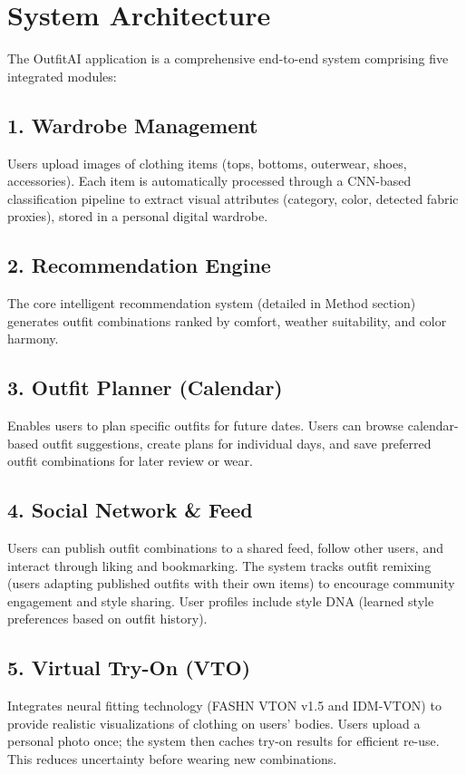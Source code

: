 \documentclass[stu,man]{apa7}
\begin{document}
\section{System Architecture}
The OutfitAI application is a comprehensive end-to-end system comprising five integrated modules:

\subsection{1. Wardrobe Management}
Users upload images of clothing items (tops, bottoms, outerwear, shoes, accessories).
Each item is automatically processed through a CNN-based classification pipeline to extract visual attributes (category, color, detected fabric proxies), stored in a personal digital wardrobe.

\subsection{2. Recommendation Engine}
The core intelligent recommendation system (detailed in Method section) generates outfit combinations ranked by comfort, weather suitability, and color harmony.

\subsection{3. Outfit Planner (Calendar)}
Enables users to plan specific outfits for future dates.
Users can browse calendar-based outfit suggestions, create plans for individual days, and save preferred outfit combinations for later review or wear.

\subsection{4. Social Network \& Feed}
Users can publish outfit combinations to a shared feed, follow other users, and interact through liking and bookmarking.
The system tracks outfit remixing (users adapting published outfits with their own items) to encourage community engagement and style sharing.
User profiles include style DNA (learned style preferences based on outfit history).

\subsection{5. Virtual Try-On (VTO)}
Integrates neural fitting technology (FASHN VTON v1.5 and IDM-VTON) to provide realistic visualizations of clothing on users' bodies.
Users upload a personal photo once; the system then caches try-on results for efficient re-use.
This reduces uncertainty before wearing new combinations.
\newpage
\end{document}
